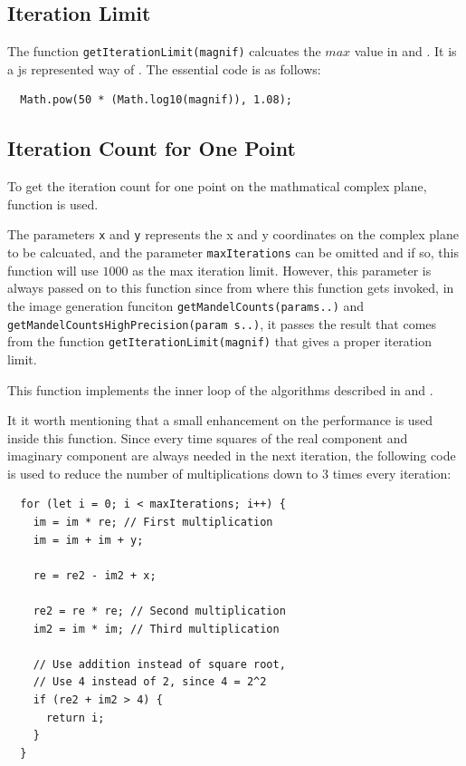 \subsection{Iteration Limit}

The function \texttt{getIterationLimit(magnif)} calcuates the $max$ value in  and . It is a \gls{js} represented way of . The essential code is as follows:

\begin{verbatim}
  Math.pow(50 * (Math.log10(magnif)), 1.08);
\end{verbatim}

\subsection{Iteration Count for One Point}

To get the iteration count for one point on the mathmatical complex plane, function  is used.

The parameters \texttt{x} and \texttt{y} represents the x and y coordinates on the complex plane to be calcuated, and the parameter \texttt{maxIterations} can be omitted and if so, this function will use $1000$ as the max iteration limit. However, this parameter is always passed on to this function since from where this function gets invoked, in the image generation funciton \texttt{getMandelCounts(params..)} and \texttt{getMandelCountsHighPrecision(param s..)}, it passes the result that comes from the function \texttt{getIterationLimit(magnif)} that gives a proper iteration limit.

This function implements the inner loop of the algorithms described in  and .

It it worth mentioning that a small enhancement on the performance is used inside this function. Since every time squares of the real component and imaginary component are always needed in the next iteration, the following code is used to reduce the number of multiplications down to $3$ times every iteration:

\begin{verbatim}
  for (let i = 0; i < maxIterations; i++) {            
    im = im * re; // First multiplication
    im = im + im + y;

    re = re2 - im2 + x;

    re2 = re * re; // Second multiplication
    im2 = im * im; // Third multiplication

    // Use addition instead of square root,
    // Use 4 instead of 2, since 4 = 2^2
    if (re2 + im2 > 4) {
      return i;
    }
  }
\end{verbatim}

